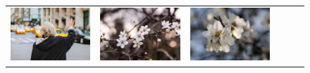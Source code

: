 \begin{figure}
\begin{minipage}[t]{\textwidth}
\begin{tabular}{m{.01\linewidth} m{.16\linewidth} m{.16\linewidth} m{.16\linewidth} m{.16\linewidth} m{.16\linewidth}}
    \includegraphics[width=\linewidth]{../style/figures/flickr_on_flickr/pred_style_Bokeh/2.jpg} &
    \includegraphics[width=\linewidth]{../style/figures/flickr_on_flickr/pred_style_Bokeh/3.jpg} &
    \includegraphics[width=\linewidth]{../style/figures/flickr_on_flickr/pred_style_Bokeh/4.jpg} \\

\end{tabular}
\end{minipage}
\end{figure}
